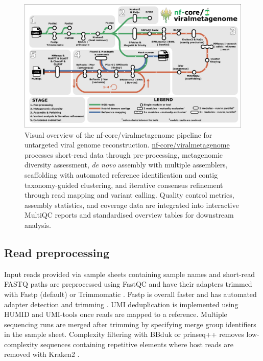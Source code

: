 \begin{figure}[htbp]
    \centering
    \includegraphics[width=1\textwidth]{Fig/fig1.png}
    \caption{Visual overview of the nf-core/viralmetagenome pipeline for untargeted viral genome reconstruction. \href{https://github.com/nf-core/viralmetagenome}{nf-core/viralmetagenome} processes short-read data through pre-processing, metagenomic diversity assessment, \textit{de novo} assembly with multiple assemblers, scaffolding with automated reference identification and contig taxonomy-guided clustering, and iterative consensus refinement through read mapping and variant calling. Quality control metrics, assembly statistics, and coverage data are integrated into interactive MultiQC reports and standardised overview tables for downstream analysis.}
    \label{fig:pipeline-workflow}
\end{figure}

\subsection{Read preprocessing}

Input reads provided via sample sheets containing sample names and short-read FASTQ paths are preprocessed using FastQC and have their adapters trimmed with Fastp \citep{Chen2018-tu} (default) or Trimmomatic \citep{Bolger2014-si}. Fastp is overall faster and has automated adapter detection and trimming \citep{Chen2018-tu}. UMI deduplication is implemented using HUMID \citep{LarosUnknown-nx} and UMI-tools \citep{Smith2017-nk} once reads are mapped to a reference. Multiple sequencing runs are merged after trimming by specifying merge group identifiers in the sample sheet. Complexity filtering with BBduk \citep{BushnellUnknown-qy} or prinseq++ \citep{Cantu2019-vs} removes low-complexity sequences containing repetitive elements where host reads are removed with Kraken2 \citep{Wood2019-jl}.

